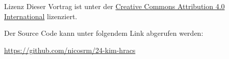 
\begin{frame}{Lizenz}
    Dieser Vortrag ist unter der \href{https://creativecommons.org/licenses/by/4.0/}{Creative Commons Attribution 4.0 International} lizenziert. \ccby

    Der Source Code kann unter folgendem Link abgerufen werden:

    \url{https://github.com/nicosrm/24-kim-hracs}
\end{frame}
